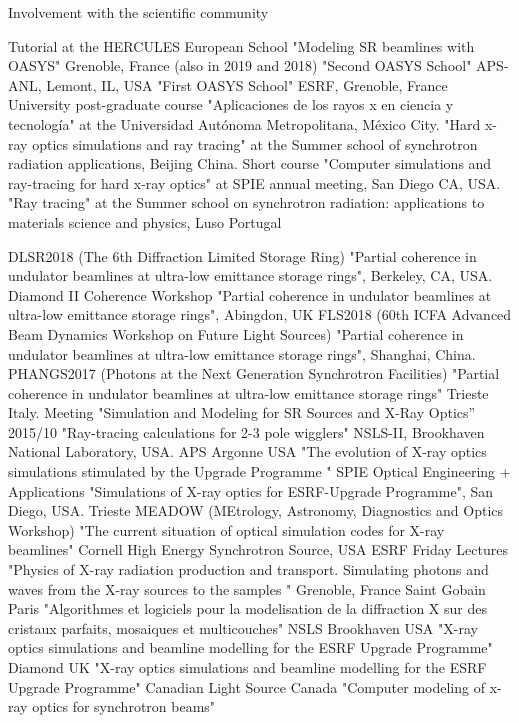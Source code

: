 \begin{rubric}{Involvement with the scientific community}


\entry*[2021]Tutorial at the HERCULES European School "Modeling SR beamlines with OASYS" Grenoble, France (also in 2019 and 2018)
\entry*[2019/12]"Second OASYS School" APS-ANL, Lemont, IL, USA
\entry*[2019/05]"First OASYS School" ESRF, Grenoble, France
\entry*[2002]University post-graduate course "Aplicaciones de los rayos x en ciencia y tecnología" at the Universidad
Aut\'onoma Metropolitana, M\'exico City.
\entry*[2001/10]"Hard x-ray optics simulations and ray tracing" at the Summer school of synchrotron radiation applications, Beijing China.
\entry*[2001/07]Short course "Computer simulations and ray-tracing for hard x-ray optics" at SPIE annual meeting, San Diego CA, USA.
\entry*[1998]"Ray tracing" at the Summer school on synchrotron radiation: applications to materials science and physics, Luso Portugal




\entry*[2018/10] DLSR2018 (The 6th Diffraction Limited Storage Ring) "Partial coherence in undulator beamlines at ultra-low emittance storage rings", Berkeley, CA, USA.
\entry*[2018/05] Diamond II Coherence Workshop "Partial coherence in undulator beamlines at ultra-low emittance storage rings", Abingdon, UK
\entry*[2018/03] FLS2018 (60th ICFA Advanced Beam Dynamics Workshop on
Future Light Sources) "Partial coherence in undulator beamlines at ultra-low emittance storage rings", Shanghai, China.
\entry*[2017] PHANGS2017 (Photons at the Next Generation Synchrotron Facilities) "Partial coherence in undulator beamlines at ultra-low emittance storage rings" Trieste Italy.
\entry*[2015] Meeting "Simulation and Modeling for SR Sources and X-Ray Optics” 2015/10 "Ray-tracing calculations for 2-3 pole wigglers" NSLS-II, Brookhaven National Laboratory, USA.
\entry*[2014/11] APS Argonne USA "The evolution of X-ray optics simulations stimulated by the Upgrade Programme
"
\entry*[2014/08] SPIE Optical Engineering + Applications "Simulations of X-ray optics for ESRF-Upgrade Programme", San Diego, USA.
\entry*[2013] Trieste MEADOW (MEtrology, Astronomy, Diagnostics and Optics Workshop) "The current situation of optical simulation codes for X-ray beamlines"
\entry*[2011/08] Cornell High Energy Synchrotron Source, USA
\entry*[2011/06] ESRF Friday Lectures "Physics of X-ray radiation production and transport. Simulating photons and waves from the X-ray sources to the samples " Grenoble, France
\entry*[2011/02] Saint Gobain Paris "Algorithmes et logiciels pour la modelisation de la diffraction X sur des cristaux parfaits, mosaiques et multicouches"
\entry*[2010] NSLS Brookhaven USA "X-ray optics simulations and beamline modelling for the ESRF Upgrade Programme"
\entry*[2009] Diamond UK "X-ray optics simulations and beamline modelling for the ESRF Upgrade Programme"
\entry*[2006] Canadian Light Source Canada "Computer modeling of x-ray optics for synchrotron beams"



\end{rubric}
